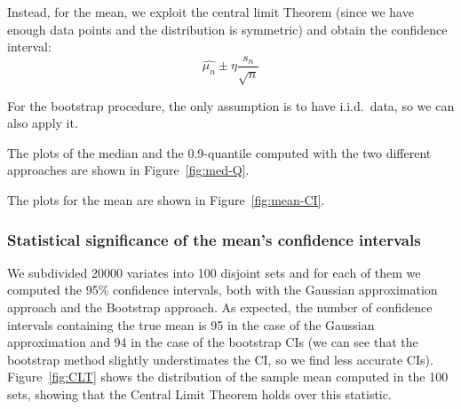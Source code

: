 \documentclass[a4paper,12pt]{article}
\begin{document}
Instead, for the mean, we exploit the central limit Theorem (since we have enough data points and the distribution is symmetric) and obtain the confidence interval:
\begin{equation*}
  \hat{\mu_n} \pm \eta\frac{s_n}{\sqrt{n}}
\end{equation*}

For the bootstrap procedure, the only assumption is to have i.i.d.\ data, so we can also apply it.

The plots of the median and the 0.9-quantile computed with the two different approaches are shown in Figure~\ref{fig:med-Q}.

The plots for the mean are shown in Figure~\ref{fig:mean-CI}.

\subsubsection*{Statistical significance of the mean's confidence intervals}

We subdivided 20000 variates into 100 disjoint sets and for each of them we computed the 95\% confidence intervals, both with the Gaussian approximation approach and the Bootstrap approach. As expected, the number of confidence intervals containing the true mean is 95 in the case of the Gaussian approximation and 94 in the case of the bootstrap CIs (we can see that the bootstrap method slightly understimates the CI, so we find less accurate CIs). Figure~\ref{fig:CLT} shows the distribution of the sample mean computed in the 100 sets, showing that the Central Limit Theorem holds over this statistic.
\end{document}
